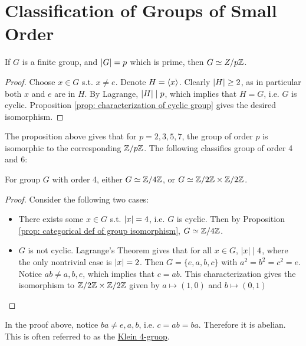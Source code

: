 \documentclass{article}
\begin{document}
\section{Classification of Groups of Small Order}

\begin{proposition}
    If $G$ is a finite group, and $\left|G\right| = p$ which is prime, then $G \simeq Z/p\mathbb{Z}$.
\end{proposition}

\begin{proof}
    Choose $x \in G$ s.t. $x \neq e$. Denote $H = \left\langle x \right\rangle$. Clearly $\left|H\right| \geq 2$, as in particular both $x$ and $e$ are in $H$. By Lagrange, $\left|H\right| \mid p$, which implies that $H = G$, i.e. $G$ is cyclic. Proposition \ref{prop: characterization of cyclic group} gives the desired isomorphism.
\end{proof}

The proposition above gives that for $p = 2, 3, 5, 7$, the group of order $p$ is isomorphic to the corresponding $\mathbb{Z}/p\mathbb{Z}$. The following classifies group of order 4 and 6:

\begin{proposition}
    For group $G$ with order 4, either $G \simeq \mathbb{Z}/4\mathbb{Z}$, or $G \simeq \mathbb{Z}/2\mathbb{Z} \times \mathbb{Z}/2\mathbb{Z}$.
\end{proposition}

\begin{proof}
    Consider the following two cases:
    \begin{itemize}
        \item There exists some $x \in G$ s.t. $\left|x\right| = 4$, i.e. $G$ is cyclic. Then by Proposition \ref{prop: categorical def of group isomorphism}, $G \simeq \mathbb{Z}/4\mathbb{Z}$.
        \item $G$ is not cyclic. Lagrange's Theorem gives that for all $x \in G$, $\left|x\right| \mid 4$, where the only nontrivial case is $\left|x\right| = 2$. Then $G = \{e, a, b, c\}$ with $a^2 = b^2 = c^2 = e$. Notice $ab \neq a, b, e$, which implies that $c = ab$. This characterization gives the isomorphism to $\mathbb{Z}/2\mathbb{Z} \times \mathbb{Z}/2\mathbb{Z}$ given by $a \mapsto (1, 0)$ and $b \mapsto (0, 1)$
    \end{itemize}
\end{proof}

\begin{remark}
    In the proof above, notice $ba \neq e, a, b$, i.e. $c = ab = ba$. Therefore it is abelian. This is often referred to as the \underline{Klein 4-gruop}.
\end{remark}
\end{document}
